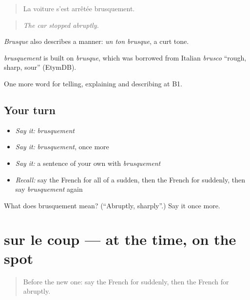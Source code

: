 \begin{quote}
La voiture s'est arrêtée brusquement.
\end{quote}

\begin{quote}
\emph{The car stopped abruptly.}
\end{quote}

\emph{Brusque} also describes a manner: \emph{un ton brusque}, a curt tone.

\begin{cousinweb}
\emph{brusquement} is built on \emph{brusque}, which was borrowed from Italian \emph{brusco} \textquotedblleft{}rough, sharp, sour\textquotedblright{} (EtymDB).
\end{cousinweb}

\begin{grammarlens}[title={What you've built}]
One more word for telling, explaining and describing at B1.
\end{grammarlens}

\subsection*{Your turn}
\begin{itemize}
\raggedright
  \item \emph{Say it:} \emph{brusquement}
  \item \emph{Say it:} \emph{brusquement}, once more
  \item \emph{Say it:} a sentence of your own with \emph{brusquement}
  \item \emph{Recall:} say the French for all of a sudden, then the French for suddenly, then say \emph{brusquement} again
\end{itemize}

\begin{tcolorbox}[breakable,colback=teal!4,colframe=teal!35!black,title={Before you move on}]
What does brusquement mean? (\textquotedblleft{}Abruptly, sharply\textquotedblright{}.) Say it once more.
\end{tcolorbox}
\section[sur le coup]{sur le coup — at the time, on the spot}

\label{lesson:FR-C270-sur-le-coup}



\begin{quote}
Before the new one: say the French for suddenly, then the French for abruptly.
\end{quote}

